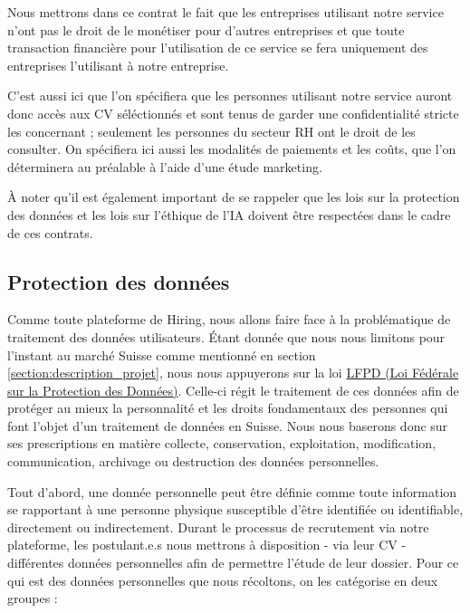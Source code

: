 Nous mettrons dans ce contrat le fait que les entreprises utilisant notre service n'ont pas le droit de le monétiser pour d'autres entreprises et que toute transaction financière pour l'utilisation de ce service se fera uniquement des entreprises l'utilisant à notre entreprise. \newline

C'est aussi ici que l'on spécifiera que les personnes utilisant notre service auront donc accès aux CV séléctionnés et sont tenus de garder une confidentialité stricte les concernant ; seulement les personnes du secteur RH ont le droit de les consulter. On spécifiera ici aussi les modalités de paiements et les coûts, que l'on déterminera au préalable à l'aide d'une étude marketing.

À noter qu'il est également important de se rappeler que les lois sur la protection des données et les lois sur l'éthique de l'IA doivent être respectées dans le cadre de ces contrats.



\subsection{Protection des données}\label{subsection:protection_des_donnees}

 Comme toute plateforme de Hiring, nous allons faire face à la problématique de traitement des données utilisateurs. Étant donnée que nous nous limitons pour l'instant au marché Suisse comme mentionné en section \ref{section:description_projet}, nous nous appuyerons sur la loi \href{https://www.fedlex.admin.ch/eli/cc/1993/1945_1945_1945/fr}{LFPD (Loi Fédérale
sur la Protection des Données)}. Celle-ci régit le traitement de ces données afin de protéger au mieux la personnalité et les droits fondamentaux des personnes qui font l’objet d’un traitement de données en Suisse. \newline 
Nous nous baserons donc sur ses prescriptions en matière collecte, conservation, exploitation, modification,  communication, archivage ou destruction des données personnelles.\newline

Tout d'abord, une donnée personnelle peut être définie comme toute information se rapportant à une personne physique susceptible d'être identifiée ou identifiable, directement ou indirectement.  Durant le processus de recrutement via notre plateforme, les postulant.e.s nous mettrons à disposition - via leur CV - différentes données personnelles afin de permettre l'étude de leur dossier. Pour ce qui est des données personnelles que nous récoltons, on les catégorise en deux groupes :\newline

